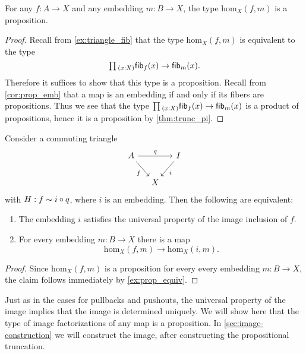 \begin{lem}
For any $f:A\to X$ and any embedding $m:B\to X$, the type $\mathrm{hom}_X(f,m)$ is a proposition.
\end{lem}

\begin{proof}
  Recall from \cref{ex:triangle_fib} that the type $\mathrm{hom}_X(f,m)$ is equivalent to the type
  \begin{equation*}
    \prd{x:X}\fib{f}{x}\to\fib{m}{x}.
  \end{equation*}
  Therefore it suffices to show that this type is a proposition. Recall from \cref{cor:prop_emb} that a map is an embedding if and only if its fibers are propositions.
  Thus we see that the type $\prd{x:X}\fib{f}{x}\to\fib{m}{x}$ is a product of propositions, hence it is a proposition by \cref{thm:trunc_pi}.
\end{proof}

\begin{prp}\label{prp:simplifly-universal-property-image}
  Consider a commuting triangle
  \begin{equation*}
    \begin{tikzcd}[column sep=small]
      A \arrow[rr,"q"] \arrow[dr,swap,"f"] & & I \arrow[dl,"i"] \\
      & X
\end{tikzcd}
  \end{equation*}
  with $H:f\sim i\circ q$, where $i$ is an embedding. Then the following are equivalent:
  \begin{enumerate}
  \item The embedding $i$ satisfies the universal property of the image inclusion of $f$.
  \item For every embedding $m:B\to X$ there is a map
    \begin{equation*}
      \mathrm{hom}_X(f,m)\to\mathrm{hom}_X(i,m).
    \end{equation*}
  \end{enumerate}
\end{prp}

\begin{proof}
Since $\mathrm{hom}_X(f,m)$ is a proposition for every every embedding $m:B\to X$, the claim follows immediately by \cref{ex:prop_equiv}.
\end{proof}

Just as in the cases for pullbacks and pushouts, the universal property of the image implies that the image is determined uniquely. We will show here that the type of image factorizations of any map is a proposition. In \cref{sec:image-construction} we will construct the image, after constructing the propositional truncation.

